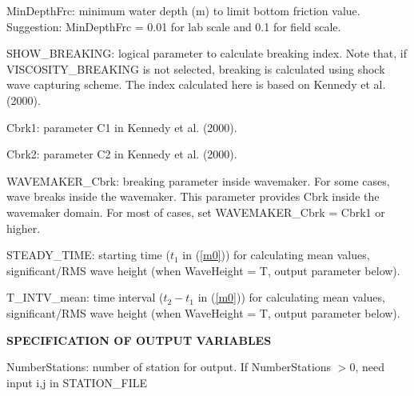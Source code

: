 \documentclass[11pt]{article}
\begin{document}
\begin{description}
\item MinDepthFrc: minimum water depth (m) to limit bottom friction value. Suggestion: MinDepthFrc = 0.01 for lab scale and 0.1 for field scale. 

\item SHOW\_BREAKING: logical parameter to calculate breaking index. Note that, if VISCOSITY\_BREAKING is not selected,  breaking is calculated using shock wave capturing scheme. The index calculated here is based on Kennedy et al. (2000). 

\item Cbrk1: parameter C1 in Kennedy et al. (2000).  

\item Cbrk2:  parameter C2 in Kennedy et al. (2000).

\item WAVEMAKER\_Cbrk: breaking parameter inside wavemaker. For some cases, wave breaks inside the wavemaker. This parameter provides Cbrk inside the wavemaker domain. For most of cases, set WAVEMAKER\_Cbrk = Cbrk1 or higher. 

\item STEADY\_TIME: starting time ($t_1$ in (\ref{m0})) for calculating mean values, significant/RMS wave height (when WaveHeight = T, output parameter below).

\item T\_INTV\_mean: time interval ($t_2-t_1$ in (\ref{m0})) for calculating mean values, significant/RMS wave height (when WaveHeight = T, output parameter below).


\item {\bf SPECIFICATION OF OUTPUT VARIABLES}

\item NumberStations: number of station for output. If NumberStations $> 0$, need input i,j in STATION\_FILE
 

\end{description}
\end{document}

